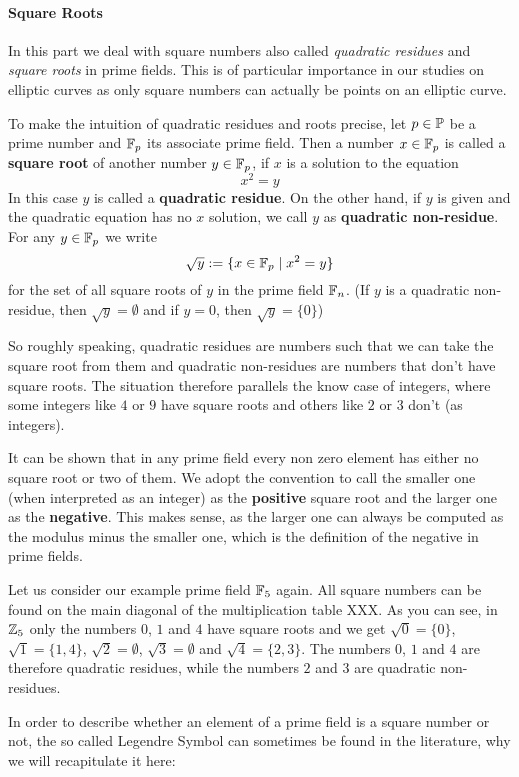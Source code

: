 \paragraph{Square Roots}
In this part we deal with square numbers also called \textit{quadratic residues} and \textit{square roots} in prime fields. This is of particular importance in our studies on elliptic curves as only square numbers can actually be points on an elliptic curve.

To make the intuition of quadratic residues and roots precise, let $p \in \mathbb{P} $ be a prime number and $\mathbb{F}_p $ its associate prime field. Then a number $x\in \mathbb{F}_p$ is called a \textbf{square root} of another number $y\in\mathbb{F}_p$, if $x$ is a solution to the equation
\begin{equation}
x^2 = y
\end{equation}
In this case $y$ is called a \textbf{quadratic residue}. On the other hand, if $y$ is given and the quadratic equation has no $x$ solution, we call $ y $ as \textbf{quadratic non-residue}. For any $ y \in \mathbb{F}_p $ we write
\begin{equation}
\sqrt{y}: = \{x \in \mathbb{F}_p \; | \; x^2 = y \}
\end{equation}
for the set of all square roots of $ y $ in the prime field $ \mathbb{F}_n $. (If $ y $ is a quadratic non-residue, then $ \sqrt{y} = \emptyset $ and if $ y = 0 $, then $ \sqrt{y} = \{0 \} $)

So roughly speaking, quadratic residues are numbers such that we can take the square root from them and quadratic non-residues are numbers that don't have square roots. The situation therefore parallels the know case of integers, where some integers like $4$ or $9$ have square roots and others like $2$ or $3$ don't (as integers).

It can be shown that in any prime field every non zero element has either no square root or two of them. We adopt the convention to call the smaller one (when interpreted as an integer) as the \textbf{positive} square root and the larger one as the \textbf{negative}. This makes sense, as the larger one can always be computed as the modulus minus the smaller one, which is the definition of the negative in prime fields.


\begin{example}  Let us consider our example prime field $\mathbb{F}_5$ again. All square numbers can be found on the main diagonal of the multiplication table XXX. As you can see, in $ \mathbb{Z}_5 $ only the numbers $ 0 $, $ 1 $ and $ 4 $ have square roots and we get $ \sqrt{0} = \{0 \} $, $ \sqrt{1} = \{1,4 \} $, $ \sqrt{2} = \emptyset $, $ \sqrt{3} = \emptyset $ and $ \sqrt{4} = \{2,3 \} $. The numbers $0$, $1$ and $4$ are therefore quadratic residues, while the numbers $2$ and $3$ are quadratic non-residues.
\end{example}
In order to describe whether an element of a prime field is a square number  or not, the so called Legendre Symbol can sometimes be found in the literature, why we will recapitulate it here:

